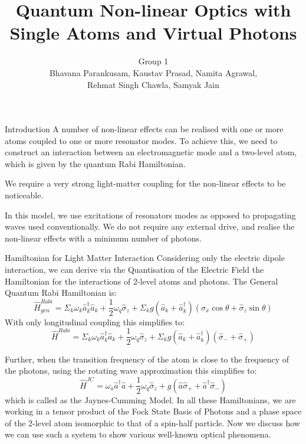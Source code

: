 \documentclass[pdf,9pt]{beamer}
\title[PH 421 Project Presentation]{Quantum Non-linear Optics with Single Atoms and Virtual Photons}
\author[Group 1]{Group 1 \\
Bhavana Parankusam, Kaustav Prasad, Namita Agrawal,\\
Rehmat Singh Chawla, Samyak Jain}
\institute{Physics Department - IIT Bombay}
\date{}
\begin{document}
    \begin{frame}
      \titlepage
    \end{frame}
    \begin{frame}{Introduction}
        A number of non-linear effects can be realised with one or more atoms coupled to one or more resonator modes. To achieve this, we need to construct an interaction between an electromagnetic mode and a two-level atom, which is given by the quantum Rabi Hamiltonian.
        
       We require a very strong light-matter coupling for the non-linear effects to be noticeable.
       
       In this model, we use excitations of resonators modes as opposed to propagating waves used conventionally. We do not require any external drive, and realise the non-linear effects with a minimum number of photons.
         
        
    \end{frame}
    \begin{frame}{Hamiltonian for Light Matter Interaction}
    Considering only the electric dipole interaction, we can derive via the Quantisation of the Electric Field the Hamiltonian for the interactions of 2-level atoms and photons. The General Quantum Rabi Hamiltonian is: \\
    
$$
\hat{H}_{gen}^{Rabi} =  \Sigma_k \omega_k \hat{a}_k^\dagger \hat{a}_k + \frac{1}{2} \omega_q \hat{\sigma}_z + \Sigma_kg(\hat{a}_k + \hat{a}_k^\dagger)(\hat{\sigma}_x \cos{\theta} + \hat{\sigma}_z\sin{\theta})
$$
    With only longitudinal coupling this simplifies to:
$$
\hat{H}^{Rabi} = \Sigma_k\omega _k \hat{a}^\dagger_k \hat{a}_k + \frac{1}{2}\omega_q \hat{\sigma}_z + \Sigma_k g(\hat{a}_k + \hat{a}_k^\dagger)(\hat{\sigma}_- + \hat{\sigma}_+)
$$

Further, when the transition frequency of the atom is close to the frequency of the photons, using the rotating wave approximation this simplifies to:
$$
\hat{H}^{JC} = \omega _a \hat{a}^\dagger \hat{a} + \frac{1}{2}\omega_q \hat{\sigma}_z + g(\hat a \hat{\sigma}_+ + \hat{a}^\dagger\hat{\sigma}_-)
$$
which is called as the Jaynes-Cumming Model. In all these Hamiltonians, we are working in a tensor product of the Fock State Basis of Photons and a phase space of the 2-level atom isomorphic to that of a spin-half particle. Now we discuss how we can use such a system to show various well-known optical phenomena.
    \end{frame}
\end{document}
